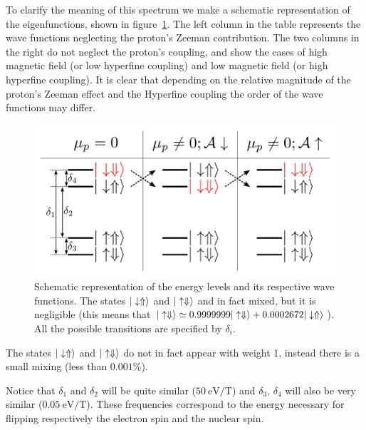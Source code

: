 To clarify the meaning of this spectrum we make a schematic representation of the eigenfunctions, shown in figure~\ref{levels1Qbit}. The left column in the table represents the wave functions neglecting the proton's Zeeman contribution. The two columns in the right do not neglect the proton's coupling, and show the cases of high magnetic field (or low hyperfine coupling) and low magnetic field (or high hyperfine coupling). It is clear that depending on the relative magnitude of the proton's Zeeman effect and the Hyperfine coupling the order of the wave functions may differ.
\begin{figure}[h!]
\centering
\includegraphics{chapter03/figures/levels.png}
\vspace{-5pt}
\caption{Schematic representation of the energy levels and its respective wave functions. The states $|\downarrow\Uparrow\rangle$ and $|\uparrow\Downarrow\rangle$ and in fact mixed, but it is negligible (this means that $|\uparrow\Downarrow\rangle\simeq0.9999999|\uparrow\Downarrow\rangle+0.0002672|\downarrow\Uparrow\rangle$). All the possible transitions are specified by $\delta_i$.}
\label{levels1Qbit}
\end{figure}
\FloatBarrier
The states $|\downarrow\Uparrow\rangle$ and $|\uparrow\Downarrow\rangle$ do not in fact appear with weight 1, instead there is a small mixing (less than $0.001\%$).

Notice that $\delta_1$ and $\delta_2$ will be quite similar ($\SI{50}{\eV/\tesla}$) and $\delta_3$, $\delta_4$ will also be very similar ($\SI{0.05}{\eV/\tesla}$). These frequencies correspond to the energy necessary for flipping respectively the electron spin and the nuclear spin.



